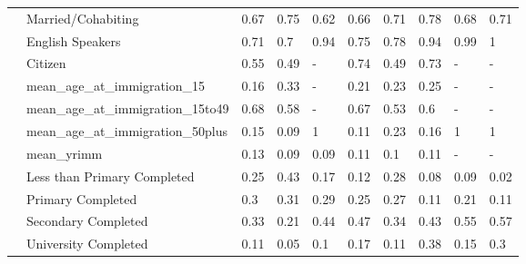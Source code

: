 \begin{table}[ht]
\begin{tabular}{l|l|llllllll}
   & Married/Cohabiting & 0.67 & 0.75 & 0.62 & 0.66 & 0.71 & 0.78 & 0.68 & 0.71 \\ 
   & English Speakers & 0.71 & 0.7 & 0.94 & 0.75 & 0.78 & 0.94 & 0.99 & 1 \\ 
   & Citizen & 0.55 & 0.49 & - & 0.74 & 0.49 & 0.73 & - & - \\ 
   & mean\_age\_at\_immigration\_15 & 0.16 & 0.33 & - & 0.21 & 0.23 & 0.25 & - & - \\ 
   & mean\_age\_at\_immigration\_15to49 & 0.68 & 0.58 & - & 0.67 & 0.53 & 0.6 & - & - \\ 
   & mean\_age\_at\_immigration\_50plus & 0.15 & 0.09 & 1 & 0.11 & 0.23 & 0.16 & 1 & 1 \\ 
   & mean\_yrimm & 0.13 & 0.09 & 0.09 & 0.11 & 0.1 & 0.11 & - & - \\ 
   & Less than Primary Completed & 0.25 & 0.43 & 0.17 & 0.12 & 0.28 & 0.08 & 0.09 & 0.02 \\ 
   & Primary Completed & 0.3 & 0.31 & 0.29 & 0.25 & 0.27 & 0.11 & 0.21 & 0.11 \\ 
   & Secondary Completed & 0.33 & 0.21 & 0.44 & 0.47 & 0.34 & 0.43 & 0.55 & 0.57 \\ 
   & University Completed & 0.11 & 0.05 & 0.1 & 0.17 & 0.11 & 0.38 & 0.15 & 0.3 \\ 
   \hline
\end{tabular}
\endgroup
\end{table}
